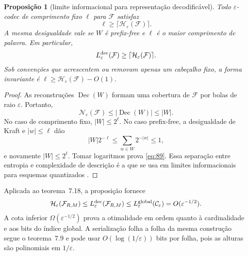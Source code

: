 \documentclass[11pt,a4paper]{article}
\theoremstyle{preciso}
\newtheorem{proposicao}[teorema]{Proposição}
\theoremstyle{definition}
\newcommand{\FF}{\mathcal F}
\newcommand{\CC}{\mathcal C}
\newcommand{\eqn}[2]{\begin{equation}\label{eq:#1}#2\end{equation}}
\begin{document}
\begin{proposicao}[limite informacional para representação decodificável]
Todo $\varepsilon$-codec de comprimento fixo $\ell$ para $\FF$ satisfaz
\eqn{89}{\ell\ge\lceil\mathcal H_\varepsilon(\FF)\rceil.}
A mesma desigualdade vale se $W$ é prefix-free e $\ell$ é o maior comprimento de palavra. Em particular,
\[
L_\varepsilon^{\rm dec}(\FF)\ge\lceil\mathcal H_\varepsilon(\FF)\rceil.
\]
Sob convenções que acrescentem ou removam apenas um cabeçalho fixo, a forma invariante é $\ell\ge\mathcal H_\varepsilon(\FF)-O(1)$.
\end{proposicao}
\begin{proof}
As reconstruções $\operatorname{Dec}(W)$ formam uma cobertura de $\FF$ por bolas de raio $\varepsilon$. Portanto,
\[
\mathcal N_\varepsilon(\FF)\le|\operatorname{Dec}(W)|\le|W|.
\]
No caso de comprimento fixo, $|W|\le2^\ell$. No caso prefix-free, a desigualdade de Kraft e $|w|\le\ell$ dão
\[
|W|2^{-\ell}\le\sum_{w\in W}2^{-|w|}\le1,
\]
e novamente $|W|\le2^\ell$. Tomar logaritmos prova \eqref{eq:89}. Essa separação entre entropia e complexidade de descrição é a que se usa em limites informacionais para esquemas quantizados \citep{bolcskei2019}.
\end{proof}
Aplicada ao teorema~7.18, a proposição fornece
\eqn{90}{\mathcal H_\varepsilon(\FF_{R,M})\le L_\varepsilon^{\rm dec}(\FF_{R,M})
\le L_\varepsilon^{\rm global}(\CC_\varepsilon)=O(\varepsilon^{-1/2}).}
A cota inferior $\Omega(\varepsilon^{-1/2})$ prova a otimalidade em ordem quanto à cardinalidade e aos bits do índice global. A serialização folha a folha da mesma construção segue o teorema~7.9 e pode usar $O(\log(1/\varepsilon))$ bits por folha, pois as alturas são polinomiais em $1/\varepsilon$.



\end{document}
